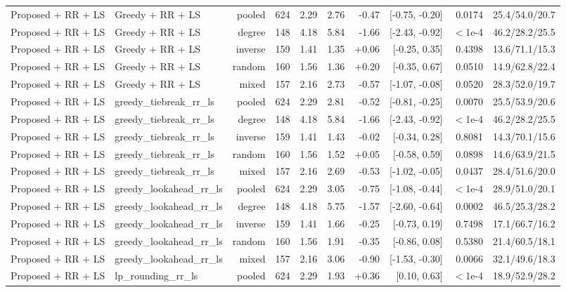 \begin{table}[t]
{\begin{tabular}{llrrrrrrrr}
Proposed + RR + LS & Greedy + RR + LS & pooled & 624 & 2.29 & 2.76 & -0.47 & [-0.75, -0.20] & 0.0174 & 25.4/54.0/20.7 \\
Proposed + RR + LS & Greedy + RR + LS & degree & 148 & 4.18 & 5.84 & -1.66 & [-2.43, -0.92] & $<$1e-4 & 46.2/28.2/25.5 \\
Proposed + RR + LS & Greedy + RR + LS & inverse & 159 & 1.41 & 1.35 & +0.06 & [-0.25, 0.35] & 0.4398 & 13.6/71.1/15.3 \\
Proposed + RR + LS & Greedy + RR + LS & random & 160 & 1.56 & 1.36 & +0.20 & [-0.35, 0.67] & 0.0510 & 14.9/62.8/22.4 \\
Proposed + RR + LS & Greedy + RR + LS & mixed & 157 & 2.16 & 2.73 & -0.57 & [-1.07, -0.08] & 0.0520 & 28.3/52.0/19.7 \\
Proposed + RR + LS & greedy\_tiebreak\_rr\_ls & pooled & 624 & 2.29 & 2.81 & -0.52 & [-0.81, -0.25] & 0.0070 & 25.5/53.9/20.6 \\
Proposed + RR + LS & greedy\_tiebreak\_rr\_ls & degree & 148 & 4.18 & 5.84 & -1.66 & [-2.43, -0.92] & $<$1e-4 & 46.2/28.2/25.5 \\
Proposed + RR + LS & greedy\_tiebreak\_rr\_ls & inverse & 159 & 1.41 & 1.43 & -0.02 & [-0.34, 0.28] & 0.8081 & 14.3/70.1/15.6 \\
Proposed + RR + LS & greedy\_tiebreak\_rr\_ls & random & 160 & 1.56 & 1.52 & +0.05 & [-0.58, 0.59] & 0.0898 & 14.6/63.9/21.5 \\
Proposed + RR + LS & greedy\_tiebreak\_rr\_ls & mixed & 157 & 2.16 & 2.69 & -0.53 & [-1.02, -0.05] & 0.0437 & 28.4/51.6/20.0 \\
Proposed + RR + LS & greedy\_lookahead\_rr\_ls & pooled & 624 & 2.29 & 3.05 & -0.75 & [-1.08, -0.44] & $<$1e-4 & 28.9/51.0/20.1 \\
Proposed + RR + LS & greedy\_lookahead\_rr\_ls & degree & 148 & 4.18 & 5.75 & -1.57 & [-2.60, -0.64] & 0.0002 & 46.5/25.3/28.2 \\
Proposed + RR + LS & greedy\_lookahead\_rr\_ls & inverse & 159 & 1.41 & 1.66 & -0.25 & [-0.73, 0.19] & 0.7498 & 17.1/66.7/16.2 \\
Proposed + RR + LS & greedy\_lookahead\_rr\_ls & random & 160 & 1.56 & 1.91 & -0.35 & [-0.86, 0.08] & 0.5380 & 21.4/60.5/18.1 \\
Proposed + RR + LS & greedy\_lookahead\_rr\_ls & mixed & 157 & 2.16 & 3.06 & -0.90 & [-1.53, -0.30] & 0.0066 & 32.1/49.6/18.3 \\
Proposed + RR + LS & lp\_rounding\_rr\_ls & pooled & 624 & 2.29 & 1.93 & +0.36 & [0.10, 0.63] & $<$1e-4 & 18.9/52.9/28.2 \\

\end{tabular}}
\end{table}
